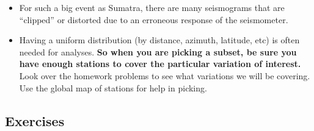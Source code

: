 \documentclass[11pt,titlepage,fleqn]{article}
\begin{document}
\begin{itemize}
\begin{itemize}
\item For such a big event as Sumatra, there are many seismograms that are ``clipped'' or distorted due to an erroneous response of the seismometer.

\item Having a uniform distribution (by distance, azimuth, latitude, etc) is often needed for analyses. {\bf So when you are picking a subset, be sure you have enough stations to cover the particular variation of interest.} Look over the homework problems to see what variations we will be covering. Use the global map of stations for help in picking.
\end{itemize}

\end{itemize}


\subsection*{Exercises}
\end{document}
